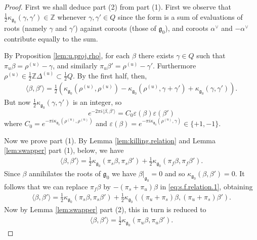 \documentclass[12pt]{amsart}
\theoremstyle{plain}
\theoremstyle{definition}
\numberwithin{equation}{section}
\newcommand{\al}{\alpha}
\newcommand{\D}{\Delta}
\newcommand{\Z}{\mathbb{Z}}
\newcommand{\g}{\mathfrak{g}}
\begin{document}
\begin{proof}
First we shall deduce part (2) from part (1). First we observe that $\frac{1}{2}\kappa_{\g_0}(\gamma, \gamma') \in \Z$ whenever $\gamma, \gamma' \in Q$ since the form is a sum of evaluations of roots (namely $\gamma$ and $\gamma'$) against coroots (those of $\g_0$), and coroots $\al^\vee$ and $-\al^\vee$ contribute equally to the sum.

By Proposition \ref{lem:u.proj.rho}, for each $\beta$ there exists $\gamma \in Q$ such that $\pi_u\beta = \rho^{(u)} - \gamma$, and similarly $\pi_u\beta' = \rho^{(u)} - \gamma'$. Furthermore $\rho^{(u)} \in \frac{1}{2}\Z\D^{(u)} \subset \frac{1}{2}Q$. By the first half, then,
\begin{align*}
\langle \beta, \beta' \rangle = \frac{1}{2}\left( \kappa_{\g_0}(\rho^{(u)}, \rho^{(u)}) - \kappa_{\g_0}(\rho^{(u)}, \gamma + \gamma') + \kappa_{\g_0}(\gamma, \gamma') \right).
\end{align*}
But now $\frac{1}{2}\kappa_{\g_0}(\gamma, \gamma')$ is an integer, so
\[
e^{-2\pi i \langle \beta, \beta' \rangle} = C_0 \varepsilon(\beta) \varepsilon(\beta')
\]
where $C_0 = e^{-\pi i \kappa_{\g_0}(\rho^{(u)}, \rho^{(u)})}$ and $\varepsilon(\beta) = e^{-\pi i \kappa_{\g_0}(\rho^{(u)}, \gamma)} \in \{+1, -1\}$.

Now we prove part (1). By Lemma {\ref{lem:killing.relation}} and Lemma {\ref{lem:swapper} part (1),} below, we have
\begin{align}\label{eq:s.f.relation.1}
\langle \beta, \beta' \rangle = \frac{1}{2}\kappa_{\g_0}(\pi_s\beta, \pi_s\beta') + \frac{1}{2}\kappa_{\g_0}(\pi_f\beta, \pi_f\beta').
\end{align}
Since $\beta$ annihilates the roots of $\g_0$ we have $\beta|_{\g_0} = 0$ and so $\kappa_{\g_0}(\beta, \beta') = 0$. It follows that we can replace $\pi_f \beta$ by $-(\pi_s+\pi_u) \beta$ in \eqref{eq:s.f.relation.1}, obtaining
\begin{align}\label{eq:s.f.relation.3}
\langle \beta, \beta' \rangle = \frac{1}{2}\kappa_{\g_0}(\pi_s\beta, \pi_s\beta') + \frac{1}{2}\kappa_{\g_0}((\pi_u+\pi_s)\beta, (\pi_u+\pi_s)\beta').
\end{align}
Now by Lemma {\ref{lem:swapper} part (2)}, this in turn is reduced to
\begin{align}\label{eq:s.f.relation.4}
\langle \beta, \beta' \rangle = \frac{1}{2}\kappa_{\g_0}(\pi_u\beta, \pi_u\beta').
\end{align}
\end{proof}
\end{document}
